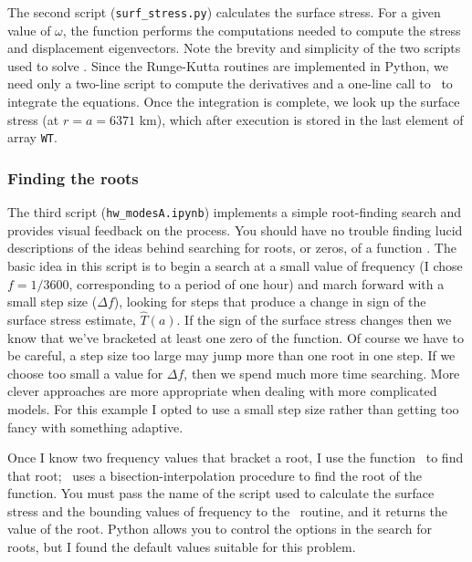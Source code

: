 \documentclass[11pt,titlepage,fleqn]{article}
\newcommand{\tfilemain}{{\tt hw\_modesA.ipynb}}
\newcommand{\tfiless}{{\tt surf\_stress.py}}
\begin{document}
The second script (\tfiless) calculates the surface stress. For a given value of $\omega$, the function performs the computations needed to compute the stress and displacement eigenvectors. Note the brevity and simplicity of the two scripts used to solve . Since the Runge-Kutta routines are implemented in Python, we need only a two-line script to compute the derivatives and a one-line call to \sfind\ to integrate the equations. Once the integration is complete, we look up the surface stress (at $r = a = 6371$ km), which after execution is stored in the last element of array \verb+WT+.

\subsubsection{Finding the roots}

The third script (\tfilemain) implements a simple root-finding search and provides visual feedback on the process. You should have no trouble finding lucid descriptions of the ideas behind searching for roots, or zeros, of a function \citep[\eg][]{Press1988}. The basic idea in this script is to begin a search at a small value of frequency (I chose $f = 1/3600$, corresponding to a period of one hour) and march forward with a small step size ($\Delta f$), looking for steps that produce a change in sign of the surface stress estimate, $\hat{T}(a)$. If the sign of the surface stress changes then we know that we’ve bracketed at least one zero of the function. Of course we have to be careful, a step size too large may jump more than one root in one step. If we choose too small a value for $\Delta f$, then we spend much more time searching. More clever approaches are more appropriate when dealing with more complicated models. For this example I opted to use a small step size rather than getting too fancy with something adaptive.

Once I know two frequency values that bracket a root, I use the function \rfind\ to find that root; \rfind\ uses a bisection-interpolation procedure to find the root of the function.
You must pass the name of the script used to calculate the surface stress and the bounding values of frequency to the \rfind\ routine, and it returns the value of the root. Python allows you to control the options in the search for roots, but I found the default values suitable for this problem.

\end{document}
